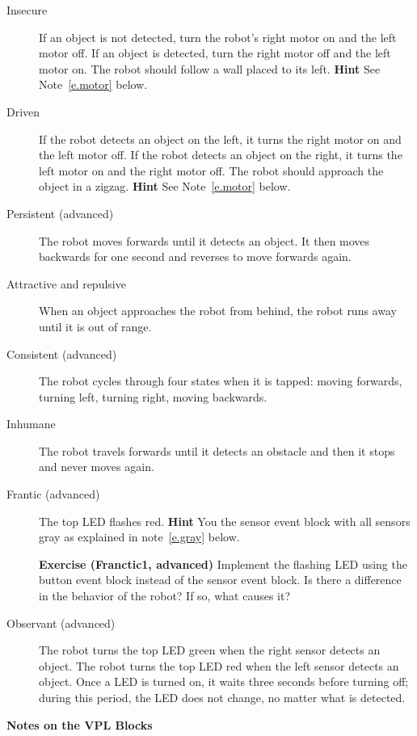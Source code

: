 \documentclass[12pt,a4paper,english]{report}
\begin{document}
\begin{description}
\item[Insecure] If an object is not detected, turn the robot's right
motor on and the left motor off. If an object is detected, turn the
right motor off and the left motor on. The robot should follow a wall
placed to its left. \textbf{Hint} See Note~\ref{e.motor} below.

\item[Driven] If the robot detects an object on the left, it turns the
right motor on and the left motor off. If the robot detects an object on
the right, it turns the left motor on and the right motor off. The robot
should approach the object in a zigzag. \textbf{Hint} See
Note~\ref{e.motor} below.

\item[Persistent (advanced)] The robot moves forwards until it detects
an object. It then moves backwards for one second and reverses to move
forwards again.

\item[Attractive and repulsive] When an object approaches the robot from
behind, the robot runs away until it is out of range.

\item[Consistent (advanced)] The robot cycles through four states when
it is tapped: moving forwards, turning left, turning right, moving
backwards.

\item[Inhumane] The robot travels forwards until it detects an obstacle
and then it stops and never moves again.

\item[Frantic (advanced)] The top LED flashes red. \textbf{Hint} You the
sensor event block with all sensors gray as explained in
note~\ref{e.gray} below.

\textbf{Exercise (Franctic1, advanced)} Implement the flashing LED using
the button event block instead of the sensor event block. Is there a
difference in the behavior of the robot? If so, what causes it?

\item[Observant (advanced)] The robot turns the top LED green when the
right sensor detects an object. The robot turns the top LED red when the
left sensor detects an object. Once a LED is turned on, it waits three
seconds before turning off; during this period, the LED does not change,
no matter what is detected.

\end{description}

\begin{center}
\Large \textbf{Notes on the VPL Blocks}
\end{center}
\end{document}
